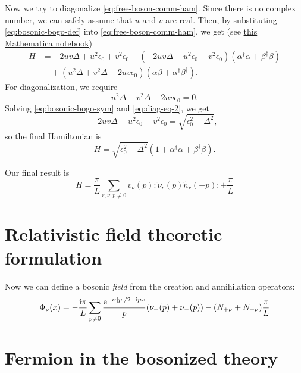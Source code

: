 \documentclass[hyperref, a4paper]{article}
\newcommand*{\ii}{\mathrm{i}}
\newcommand*{\ee}{\mathrm{e}}
\newcommand*{\normalorder}[1]{: #1 :}
\begin{document}
\begin{note*}{}
    Now we try to diagonalize \eqref{eq:free-boson-comm-ham}. Since there is no complex number, we can safely 
    assume that $u$ and $v$ are real. Then, by substituting \eqref{eq:bosonic-bogo-def} into \eqref{eq:free-boson-comm-ham}, we get (see \href{./bosonic-bogoliubov.nb}{this Mathematica notebook})
    \[
        \begin{aligned}
            H &= -2 u v \Delta+u^{2} \epsilon_{0}+v^{2} \epsilon_{0} + (-2 u v \Delta+u^{2} \epsilon_{0}+v^{2} \epsilon_{0}) (\alpha^\dagger \alpha + \beta^\dagger \beta) \\
            &\quad + (u^{2} \Delta+v^{2} \Delta-2 u v \epsilon_{0} ) (\alpha \beta + \alpha^\dagger \beta^\dagger).
        \end{aligned} 
    \]
    For diagonalization, we require 
    \begin{equation}
        u^{2} \Delta+v^{2} \Delta-2 u v \epsilon_{0} = 0.
        \label{eq:diag-eq-2}
    \end{equation}
    Solving \eqref{eq:bosonic-bogo-sym} and \eqref{eq:diag-eq-2}, we get 
    \[
        -2 u v \Delta+u^{2} \epsilon_{0}+v^{2} \epsilon_{0} = \sqrt{\epsilon_0^2 - \Delta^2},
    \]
    so the final Hamiltonian is 
    \begin{equation}
        H = \sqrt{\epsilon_0^2 - \Delta^2} (1 + \alpha^\dagger \alpha + \beta^\dagger \beta).
    \end{equation}
\end{note*}

Our final result is 
\begin{equation}
    H = \frac{\pi}{L} \sum_{r, \nu, p \neq 0} v_\nu(p) \normalorder{\tilde{\nu}_r(p) \tilde{n}_{r}(-p)} + \frac{\pi}{L} %
\end{equation}

\section{Relativistic field theoretic formulation}

Now we can define a bosonic \emph{field} from the creation and annihilation operators:
\begin{equation}
    \Phi_\nu(x) = - \frac{\ii \pi}{L} \sum_{p \neq 0} \frac{\ee^{- \alpha \abs*{p} / 2 - \ii p x}}{p} (\nu_+(p) + \nu_-(p)) - (N_{+\nu} + N_{- \nu}) \frac{\pi}{L} %
\end{equation}

\section{Fermion in the bosonized theory}
\end{document}
